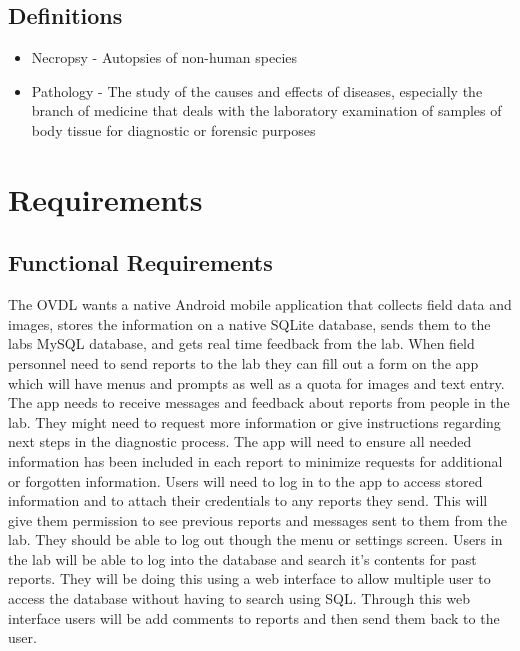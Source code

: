 \documentclass[onecolumn, draftclsnofoot,10pt, compsoc]{IEEEtran}
\begin{document}
\subsection{Definitions}
\begin{itemize}
\item Necropsy - Autopsies of non-human species

\item Pathology - The study of the causes and effects of diseases, especially the branch of medicine that deals with the laboratory examination of samples of body tissue for diagnostic or forensic purposes
\end{itemize}

\section{Requirements}
\subsection{Functional Requirements}
The OVDL wants a native Android mobile application that collects field data and images, stores the information on a native SQLite database, sends them to the labs MySQL database, and gets real time feedback from the lab. 
When field personnel need to send reports to the lab they can fill out a form on the app which will have menus and prompts as well as a quota for images and text entry.
\newline
The app needs to receive messages and feedback about reports from people in the lab. 
They might need to request more information or give instructions regarding next steps in the diagnostic process. 
The app will need to ensure all needed information has been included in each report to minimize requests for additional or forgotten information. 
\newline
Users will need to log in to the app to access stored information and to attach their credentials to any reports they send. This will give them permission to see previous reports and messages sent to them from the lab. 
They should be able to log out though the menu or settings screen. 
\newline 
Users in the lab will be able to log into the database and search it's contents for past reports. They will be doing this using a web interface to allow multiple user to access the database without having to search using SQL. Through this web interface users will be add comments to reports and then send them back to the user. 
\end{document}
